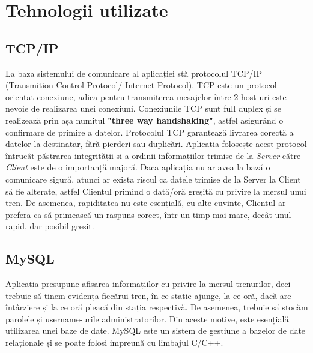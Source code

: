 \documentclass{article}
\begin{document}
\section{Tehnologii utilizate}
    \subsection{TCP/IP}
    La baza sistemului de comunicare al aplicației stă protocolul TCP/IP (Transmition Control Protocol/ Internet Protocol). TCP este un protocol orientat-conexiune, adica pentru transmiterea mesajelor între 2 host-uri este nevoie de realizarea unei conexiuni. Conexiunile TCP sunt full duplex și se realizează prin așa numitul \textbf{"three way handshaking"}, astfel asigurând o confirmare de primire a datelor. Protocolul TCP garantează livrarea corectă a datelor la destinatar, fără pierderi sau duplicări. Aplicatia folosește acest protocol întrucât
    păstrarea integrității  și a ordinii informațiilor trimise de la \textit{Server} către \textit{Client} este de o importanță majoră. Daca aplicația nu ar avea la bază o comunicare sigură, atunci ar exista riscul ca datele trimise de la Server la Client să fie alterate, astfel Clientul primind o dată/oră greșită cu privire la mersul unui tren. De asemenea, rapiditatea nu este esențială, cu alte cuvinte, Clientul ar prefera ca să primească un raspuns corect, într-un timp mai mare, decât unul rapid, dar posibil gresit.
    
\subsection{MySQL}
    Aplicația presupune afișarea informațiilor cu privire la mersul trenurilor, deci trebuie să ținem evidența fiecărui tren, în ce stație ajunge, la ce oră, dacă are întârziere și la ce oră pleacă din stația respectivă. De asemenea, trebuie să stocăm parolele și username-urile administratorilor. Din aceste motive, este esențială utilizarea unei baze de date. MySQL este un sistem de gestiune a bazelor de date relaționale și se poate folosi impreună cu limbajul C/C++.
    
\end{document}
